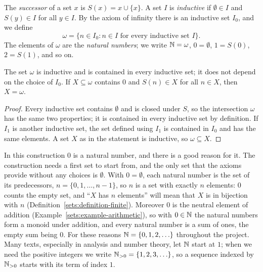 \begin{definition}\label{sets:definition-natural-numbers}
The \emph{successor} of a set $x$ is $S(x) = x \cup \{x\}$. A set $I$ is
\emph{inductive} if $\emptyset \in I$ and $S(y) \in I$ for all $y \in I$. By the
axiom of infinity there is an inductive set $I_0$, and we define
\[
\omega = \{n \in I_0 : n \in I \text{ for every inductive set } I\}.
\]
The elements of $\omega$ are the \emph{natural numbers}; we write
$\mathbb{N} = \omega$, $0 = \emptyset$, $1 = S(0)$, $2 = S(1)$, and so on.
\end{definition}

\begin{theorem}[Induction]\label{sets:theorem-induction}
The set $\omega$ is inductive and is contained in every inductive set; it
does not depend on the choice of $I_0$. If $X \subseteq \omega$ contains $0$
and $S(n) \in X$ for all $n \in X$, then $X = \omega$.
\end{theorem}

\begin{proof}
Every inductive set contains $\emptyset$ and is closed under $S$, so the
intersection $\omega$ has the same two properties; it is contained in every
inductive set by definition. If $I_1$ is another inductive set, the set
defined using $I_1$ is contained in $I_0$ and has the same elements. A set $X$
as in the statement is inductive, so $\omega \subseteq X$.
\end{proof}

\begin{remark}\label{sets:remark-zero-natural}
In this construction $0$ is a natural number, and there is a good reason for it.
The construction needs a first set to start from, and the only set that the
axioms provide without any choices is $\emptyset$. With $0 = \emptyset$, each
natural number is the set of its predecessors,
$n = \{0, 1, \ldots, n - 1\}$, so $n$ is a set with exactly $n$ elements: $0$
counts the empty set, and ``$X$ has $n$ elements'' will mean that $X$ is in
bijection with $n$ (Definition~\ref{sets:definition-finite}). Moreover $0$ is the
neutral element of addition (Example~\ref{sets:example-arithmetic}), so with
$0 \in \mathbb{N}$ the natural numbers form a monoid under addition, and every natural
number is a sum of ones, the empty sum being $0$. For these reasons
$\mathbb{N} = \{0, 1, 2, \ldots\}$ throughout the project. Many texts, especially in
analysis and number theory, let $\mathbb{N}$ start at $1$; when we need the positive
integers we write $\mathbb{N}_{>0} = \{1, 2, 3, \ldots\}$, so a sequence indexed by
$\mathbb{N}_{>0}$ starts with its term of index $1$.
\end{remark}

